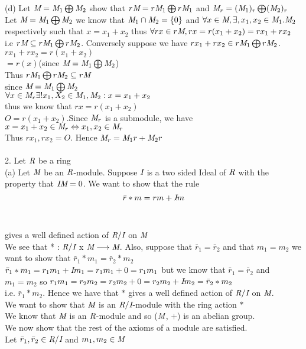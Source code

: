 \documentclass{article}
\begin{document}
(d) Let $\emph{M} = \emph{M}_1\bigoplus \emph{M}_2$ show that 
$r\emph{M} = r\emph{M}_1\bigoplus r\emph{M}_1$ and 
$\emph{M}_r = (\emph{M}_1)_r \bigoplus (\emph{M}_2)_r$ 
\\
Let $\emph{M} =  \emph{M}_1\bigoplus \emph{M}_2$ we know that $\emph{M}_1 \cap \emph{M}_2 = \{0\}$
and $\forall x \in \emph{M}, \exists, x_1, x_2 \in \emph{M}_1. \emph{M}_2$ respectively such that
$x = x_1+x_2$ thus 
$\forall rx\in r\emph{M}, rx = r(x_1 + x_2) = rx_1 + rx_2$ i.e 
$r\emph{M} \subseteq r\emph{M}_1 \bigoplus r\emph{M}_2$. Conversely suppose we have 
$rx_1+rx_2\in r\emph{M}_1 \bigoplus r\emph{M}_2$.\\
$rx_1 + rx_2 = r(x_1 + x_2)$\\$=r(x)$(since 
$\emph{M} = \emph{M}_1 \bigoplus \emph{M}_2$)\\Thus 
$r\emph{M}_1 \bigoplus r\emph{M}_2 \subseteq r\emph{M}$
\\
since $\emph{M} = \emph{M}_1 \bigoplus \emph{M}_2$\\
$\forall x \in\emph{M}_r \exists ! x_1, X_2 \in\emph{M}_1,\emph{M}_2 : x=x_1+x_2$\\
thus we know that $rx=r(x_1+x_2)$\\
$O=r(x_1+x_2)$.Since $\emph{M}_r$ is a submodule, we have 
$x=x_1+x_2\in\emph{M}_r\Leftrightarrow x_1,x_2\in\emph{M}_r$\\
Thus $rx_1, rx_2 = O$. Hence $\emph{M}_r =\emph{M}_1r + \emph{M}_2r $
\\\\
2. Let $\emph{R}$ be a ring\\
(a) Let $\emph{M}$ be an $\emph{R}$-module. Suppose $\emph{I}$ 
is a two sided Ideal of $\emph{R}$ with
the property that $\emph{I}\emph{M} = 0$. We want to show that the rule 
$$\bar{r} * m = rm + \emph{I}m$$\\
\\
gives a well defined action of $\emph{R}/\emph{I}$ on $\emph{M}$\\
We see that * : $\emph{R}/\emph{I}$ x $\emph{M}\longrightarrow\emph{M}$. 
Also, suppose that $\bar{r}_1 = \bar{r}_2$ and that $m_1 = m_2$ we want to show that 
$\bar{r}_1 * m_1 = \bar{r}_2 * m_2$\\
$\bar{r}_1 * m_1 = r_1m_1 + \emph{I}m_1 = r_1m_1 + 0 = r_1m_1$ 
but we know that $\bar{r}_1 = \bar{r}_2$ and 
$m_1 = m_2$ so 
$r_1m_1 = r_2m_2 = r_2m_2 + 0 = r_2m_2 + \emph{I}m_2 = \bar{r}_2 * m_2$\\
i.e. $\bar{r}_1 * m_2$. Hence we have that $*$ gives a well defined action of $\emph{R}/\emph{I}$ on
 $\emph{M}$.\\
We want to show that $\emph{M}$ is an $\emph{R}/\emph{I}$-module with the ring action $*$\\
We know that $\emph{M}$ is an $\emph{R}$-module and so ($\emph{M}$, $+$) is an abelian group.\\
We now show that the rest of the axioms of a module are satisfied.\\
Let  $\bar{r}_1, \bar{r}_2\in\emph{R}/\emph{I}$ and $m_1, m_2\in\emph{M}$\\
\\
\end{document}
